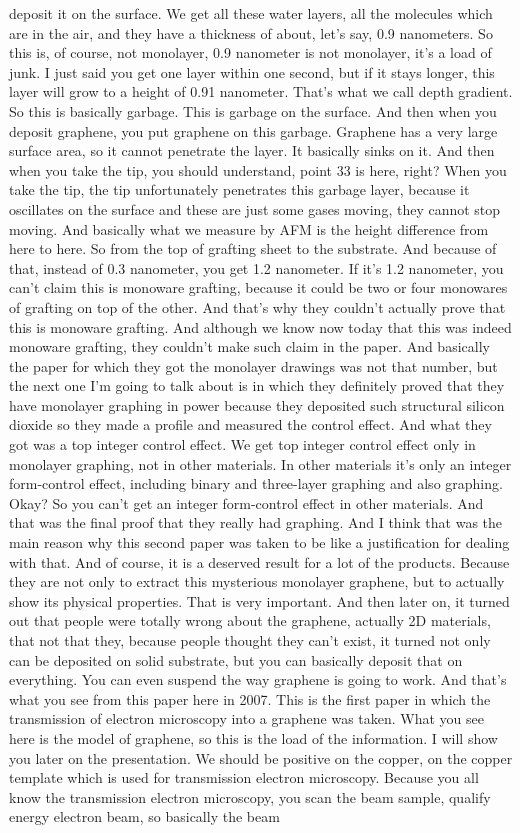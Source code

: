 deposit it on the surface. We get all these water layers, all the molecules which are in the air, and they have a thickness of about, let's say, 0.9 nanometers. So this is, of course, not monolayer, 0.9 nanometer is not monolayer, it's a load of junk. I just said you get one layer within one second, but if it stays longer, this layer will grow to a height of 0.91 nanometer. That's what we call depth gradient. So this is basically garbage. This is garbage on the surface. And then when you deposit graphene, you put graphene on this garbage. Graphene has a very large surface area, so it cannot penetrate the layer. It basically sinks on it. And then when you take the tip, you should understand, point 33 is here, right? When you take the tip, the tip unfortunately penetrates this garbage layer, because it oscillates on the surface and these are just some gases moving, they cannot stop moving. And basically what we measure by AFM is the height difference from here to here. So from the top of grafting sheet to the substrate. And because of that, instead of 0.3 nanometer, you get 1.2 nanometer. If it's 1.2 nanometer, you can't claim this is monoware grafting, because it could be two or four monowares of grafting on top of the other. And that's why they couldn't actually prove that this is monoware grafting. And although we know now today that this was indeed monoware grafting, they couldn't make such claim in the paper. And basically the paper for which they got the monolayer drawings was not that number, but the next one I'm going to talk about is in which they definitely proved that they have monolayer graphing in power because they deposited such structural silicon dioxide so they made a profile and measured the control effect. And what they got was a top integer control effect. We get top integer control effect only in monolayer graphing, not in other materials. In other materials it's only an integer form-control effect, including binary and three-layer graphing and also graphing. Okay? So you can't get an integer form-control effect in other materials. And that was the final proof that they really had graphing. And I think that was the main reason why this second paper was taken to be like a justification for dealing with that. And of course, it is a deserved result for a lot of the products. Because they are not only to extract this mysterious monolayer graphene, but to actually show its physical properties. That is very important. And then later on, it turned out that people were totally wrong about the graphene, actually 2D materials, that not that they, because people thought they can't exist, it turned not only can be deposited on solid substrate, but you can basically deposit that on everything. You can even suspend the way graphene is going to work. And that's what you see from this paper here in 2007. This is the first paper in which the transmission of electron microscopy into a graphene was taken. What you see here is the model of graphene, so this is the load of the information. I will show you later on the presentation. We should be positive on the copper, on the copper template which is used for transmission electron microscopy. Because you all know the transmission electron microscopy, you scan the beam sample, qualify energy electron beam, so basically the beam 